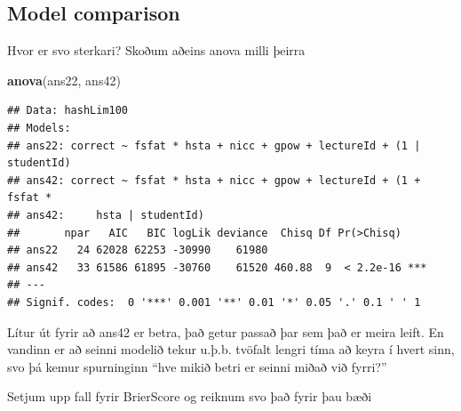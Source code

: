 \documentclass[
]{article}
\newenvironment{Shaded}{\begin{snugshade}}{\end{snugshade}}
\newcommand{\KeywordTok}[1]{\textcolor[rgb]{0.13,0.29,0.53}{\textbf{#1}}}
\newcommand{\NormalTok}[1]{#1}
\begin{document}
\hypertarget{model-comparison}{%
\subsection{Model comparison}\label{model-comparison}}

Hvor er svo sterkari? Skoðum aðeins anova milli þeirra

\begin{Shaded}
\begin{Highlighting}[]
\KeywordTok{anova}\NormalTok{(ans22, ans42)}
\end{Highlighting}
\end{Shaded}

\begin{verbatim}
## Data: hashLim100
## Models:
## ans22: correct ~ fsfat * hsta + nicc + gpow + lectureId + (1 | studentId)
## ans42: correct ~ fsfat * hsta + nicc + gpow + lectureId + (1 + fsfat * 
## ans42:     hsta | studentId)
##       npar   AIC   BIC logLik deviance  Chisq Df Pr(>Chisq)    
## ans22   24 62028 62253 -30990    61980                         
## ans42   33 61586 61895 -30760    61520 460.88  9  < 2.2e-16 ***
## ---
## Signif. codes:  0 '***' 0.001 '**' 0.01 '*' 0.05 '.' 0.1 ' ' 1
\end{verbatim}

Lítur út fyrir að ans42 er betra, það getur passað þar sem það er meira leift. En vandinn er að seinni modelið tekur u.þ.b. tvöfalt lengri tíma að keyra í hvert sinn, svo þá kemur spurninginn ``hve mikið betri er seinni miðað við fyrri?''

Setjum upp fall fyrir BrierScore og reiknum svo það fyrir þau bæði
\end{document}

